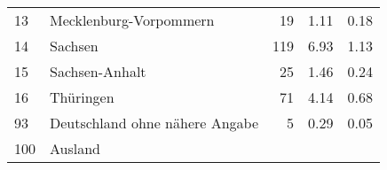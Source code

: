\begin{longtable}{lXrrr}
     13 &
     \multicolumn{1}{X}{ Mecklenburg-Vorpommern   } &


       \num{19} &
       \num[round-mode=places,round-precision=2]{1,11} &
         \num[round-mode=places,round-precision=2]{0,18} \\

     14 &
     \multicolumn{1}{X}{ Sachsen   } &


       \num{119} &
       \num[round-mode=places,round-precision=2]{6,93} &
         \num[round-mode=places,round-precision=2]{1,13} \\

     15 &
     \multicolumn{1}{X}{ Sachsen-Anhalt   } &


       \num{25} &
       \num[round-mode=places,round-precision=2]{1,46} &
         \num[round-mode=places,round-precision=2]{0,24} \\

     16 &
     \multicolumn{1}{X}{ Thüringen   } &


       \num{71} &
       \num[round-mode=places,round-precision=2]{4,14} &
         \num[round-mode=places,round-precision=2]{0,68} \\

     93 &
     \multicolumn{1}{X}{ Deutschland ohne nähere Angabe   } &


       \num{5} &
       \num[round-mode=places,round-precision=2]{0,29} &
         \num[round-mode=places,round-precision=2]{0,05} \\

     100 &
     \multicolumn{1}{X}{ Ausland   } &



\end{longtable}
